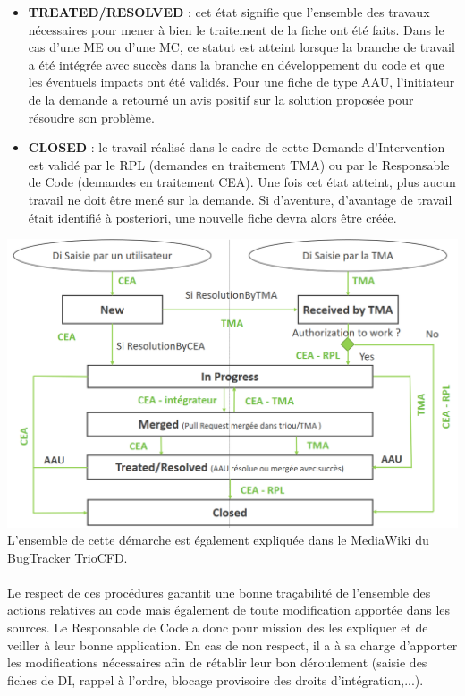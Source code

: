 \begin{itemize}[label=$\Rightarrow$, font=\LARGE]
   \item \textbf{TREATED/RESOLVED} : cet état signifie que l'ensemble des travaux nécessaires pour mener à bien le traitement de la fiche ont été faits. Dans le cas d'une ME ou d'une MC, ce statut est atteint lorsque la branche de travail a été intégrée avec succès dans la branche en développement du code et que les éventuels impacts ont été validés. Pour une fiche de type AAU, l'initiateur de la demande a retourné un avis positif sur la solution proposée pour résoudre son problème.
   \item \textbf{CLOSED} : le travail réalisé dans le cadre de cette Demande d'Intervention est validé par le RPL (demandes en traitement TMA) ou par le Responsable de Code (demandes en traitement CEA). Une fois cet état atteint, plus aucun travail ne doit être mené sur la demande. Si d'aventure, d'avantage de travail était identifié à posteriori, une nouvelle fiche devra alors être créée. 
\end{itemize}
\vspace*{0.5cm}
\includegraphics[width=16cm]{pictures/workflow_Trio.png}\vspace*{0.1cm}
\vspace*{1.5cm}
L'ensemble de cette démarche est également expliquée dans le MediaWiki du BugTracker TrioCFD. \\
\\ Le respect de ces procédures garantit une bonne tra\c cabilité de l'ensemble des actions relatives au code mais également de toute modification apportée dans les sources. Le Responsable de Code a donc pour mission des les expliquer et de veiller à leur bonne application. En cas de non respect, il a à sa charge d'apporter les modifications nécessaires afin de rétablir leur bon déroulement (saisie des fiches de DI, rappel à l'ordre, blocage provisoire des droits d'intégration,...).

